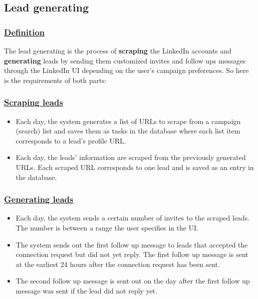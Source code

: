 \subsection{Lead generating}

\subsubsection*{\underline{Definition}}
The lead generating is the process of \textbf{scraping} the LinkedIn accounts and \textbf{generating} leads by sending them customized invites and follow ups messages through the LinkedIn UI depending on the user's campaign preferences.
So here is the requirements of both parts:

\subsubsection*{\underline{Scraping leads}}
\begin{itemize}
	\item Each day, the system generates a list of URLs to scrape from a campaign (search) list and saves them as tasks in the database where each list item corresponds to a lead's profile URL.
	\item Each day, the leads' information are scraped from the previously generated URLs. Each scraped URL corresponds to one lead and is saved as an entry in the database.
\end{itemize}

\subsubsection*{\underline{Generating leads}}
\begin{itemize}
	\item Each day, the system sends a certain number of invites to the scraped leads. The number is between a range the user specifies in the UI.
	\item The system sends out the first follow up message to leads that accepted the connection request but did not yet reply. The first follow up message is sent at the earliest 24 hours after the connection request has been sent.
	\item The second follow up message is sent out on the day after the first follow up message was sent if the lead did not reply yet.
\end{itemize}

\newpage

